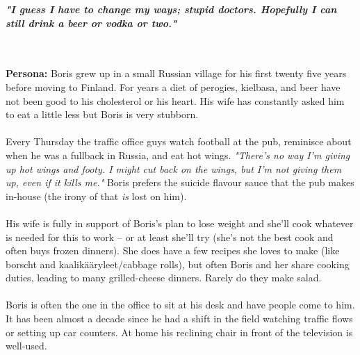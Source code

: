 \documentclass[a4paper,12pt]{article}
\begin{document}
\begin{appendices}
\begin{large}
\textbf{\textit{"I guess I have to change my ways; stupid doctors.  Hopefully I can still drink a beer or vodka or two."}}
\end{large}\\\\
\textbf{Persona:} Boris grew up in a small Russian village for his first twenty five years before moving to Finland.  For years a diet of perogies, kielbasa, and beer have not been good to his cholesterol or his heart.  His wife has constantly asked him to eat a little less but Boris is very stubborn.\\
\\
Every Thursday the traffic office guys watch football at the pub, reminisce about when he was a fullback in Russia, and eat hot wings.  \textit{"There's no way I'm giving up hot wings and footy.  I might cut back on the wings, but I'm not giving them up, even if it kills me."}  Boris prefers the suicide flavour sauce that the pub makes in-house (the irony of that \textit{is} lost on him).\\
\\
His wife is fully in support of Boris's plan to lose weight and she'll cook whatever is needed for this to work -- or at least she'll try (she's not the best cook and often buys frozen dinners).  She does have a few recipes she loves to make (like borscht and kaalik{\"a}{\"a}ryleet/cabbage rolls), but often Boris and her share cooking duties, leading to many grilled-cheese dinners.  Rarely do they make salad.\\
\\
Boris is often the one in the office to sit at his desk and have people come to him.  It has been almost a decade since he had a shift in the field watching traffic flows or setting up car counters.  At home his reclining chair in front of the television is well-used.
\newpage

\end{appendices}
\end{document}
